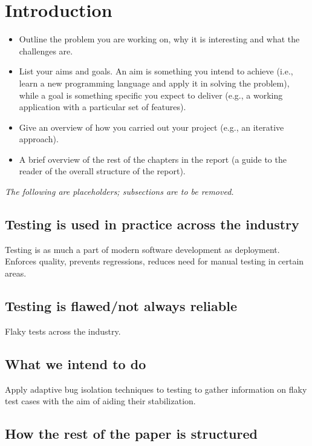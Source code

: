 \section{Introduction}
\label{sec:intro}

\begin{itemize}
	\item Outline the problem you are working on, why it is interesting and what the challenges are.
	\item List your aims and goals. An aim is something you intend to achieve (i.e., learn a new programming language and apply it in solving the problem), while a goal is something specific you expect to deliver (e.g., a working application with a particular set of features).
	\item Give an overview of how you carried out your project (e.g., an iterative approach).
	\item A brief overview of the rest of the chapters in the report (a guide to the reader of the overall structure of the report).
\end{itemize}

\textit{The following are placeholders; subsections are to be removed.}

\subsection{Testing is used in practice across the industry}

Testing is as much a part of modern software development as deployment. Enforces quality, prevents regressions, reduces need for manual testing in certain areas.

\subsection{Testing is flawed/not always reliable}

Flaky tests across the industry.

\subsection{What we intend to do}

Apply adaptive bug isolation techniques to testing to gather information on flaky test cases with the aim of aiding their stabilization.

\subsection{How the rest of the paper is structured}